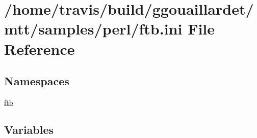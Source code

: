\hypertarget{ftb_8ini}{\section{/home/travis/build/ggouaillardet/mtt/samples/perl/ftb.ini File Reference}
\label{ftb_8ini}
}
\subsection*{Namespaces}
\begin{DoxyCompactItemize}
\item 
\hyperlink{namespaceftb}{ftb}
\end{DoxyCompactItemize}
\subsection*{Variables}
